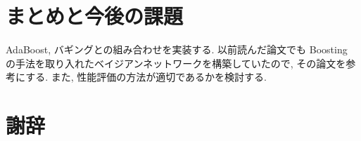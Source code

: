 \documentclass[a4j,12pt]{jarticle}
\begin{document}
\section{まとめと今後の課題}

AdaBoost, バギングとの組み合わせを実装する. 以前読んだ論文でも Boosting の手法を取り入れたベイジアンネットワークを構築していたので, その論文を参考にする. また, 性能評価の方法が適切であるかを検討する. 

\section{謝辞}



\newpage
{} %




\end{document}

